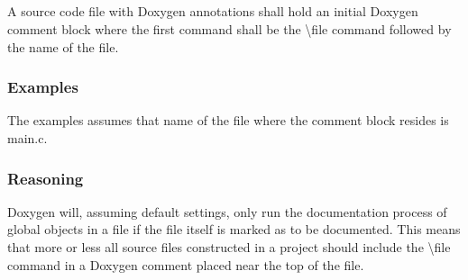 \subsection*{\doxygenRule{}}

A source code file with Doxygen annotations shall hold an initial Doxygen comment block where the first command shall be the \textbackslash file command followed by the name of the file.

\subsubsection*{Examples}

The examples assumes that name of the file where the comment block resides is main.c.

\noindent
\begin{minipage}[t]{\codelstwidth\textwidth}
    
\end{minipage}\hfill
\begin{minipage}[t]{\codelstwidth\textwidth}
    
\end{minipage}

\subsubsection*{Reasoning}

Doxygen will, assuming default settings, only run the documentation process of global objects in a file if the file itself is marked as to be documented. This means that more or less all source files constructed in a project should include the \textbackslash file command in a Doxygen comment placed near the top of the file.
